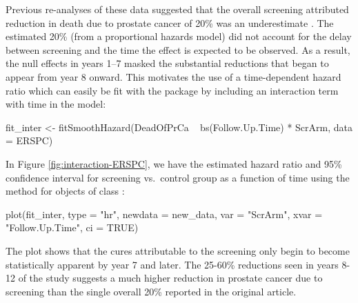 Previous re-analyses of these data suggested that the overall screening
attributed reduction in death due to prostate cancer of 20\% was an
underestimate \citep{hanley2010mortality}. The estimated 20\% (from a
proportional hazards model) did not account for the delay between
screening and the time the effect is expected to be observed. As a
result, the null effects in years 1--7 masked the substantial reductions
that began to appear from year 8 onward. This motivates the use of a
time-dependent hazard ratio which can easily be fit with the
 package by including an interaction term with time in the
model:

\begin{Schunk}
\begin{Sinput}
fit_inter <- fitSmoothHazard(DeadOfPrCa ~ bs(Follow.Up.Time) * ScrArm, 
                             data = ERSPC)
\end{Sinput}
\end{Schunk}

In Figure \ref{fig:interaction-ERSPC}, we have the estimated hazard
ratio and 95\% confidence interval for screening vs.~control group as a
function of time using the  method for objects of class
:

\begin{Schunk}
\begin{Sinput}
plot(fit_inter, type = "hr", newdata = new_data,
     var = "ScrArm", xvar = "Follow.Up.Time", ci = TRUE)
\end{Sinput}
\end{Schunk}

The plot shows that the cures attributable to the screening only begin
to become statistically apparent by year 7 and later. The 25-60\%
reductions seen in years 8-12 of the study suggests a much higher
reduction in prostate cancer due to screening than the single overall
20\% reported in the original article.

